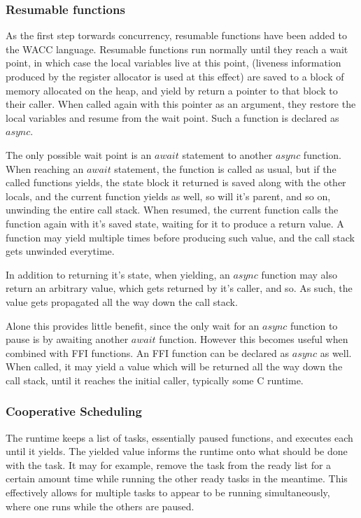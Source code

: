 \documentclass{article}
\begin{document}
\subsubsection{Resumable functions}
As the first step torwards concurrency, resumable functions have been added to the WACC language.
Resumable functions run normally until they reach a wait point, in which case the local variables live at this point,
(liveness information produced by the register allocator is used at this effect) are saved to a block of memory allocated
on the heap, and yield by return a pointer to that block to their caller. When called again with this pointer as an argument,
they restore the local variables and resume from the wait point.
Such a function is declared as $async$.

The only possible wait point is an $await$ statement to another $async$ function. When reaching an $await$ statement,
the function is called as usual, but if the called functions yields, the state block it returned is saved along with the
other locals, and the current function yields as well, so will it's parent, and so on, unwinding the entire call stack.
When resumed, the current function calls the function again with it's saved state, waiting for it to produce a return value.
A function may yield multiple times before producing such value, and the call stack gets unwinded everytime.

In addition to returning it's state, when yielding, an $async$ function may also return an arbitrary value, which gets
returned by it's caller, and so. As such, the value gets propagated all the way down the call stack.

Alone this provides little benefit, since the only wait for an $async$ function to pause is by awaiting another $await$
function. However this becomes useful when combined with FFI functions. An FFI function can be declared as $async$ as well.
When called, it may yield a value which will be returned all the way down the call stack, until it reaches the initial
caller, typically some C runtime.

\subsubsection{Cooperative Scheduling}
The runtime keeps a list of tasks, essentially paused functions, and executes each until it yields. The yielded value
informs the runtime onto what should be done with the task. It may for example, remove the task from the ready list for
a certain amount time while running the other ready tasks in the meantime. This effectively allows for multiple tasks to
appear to be running simultaneously, where one runs while the others are paused.
\end{document}
